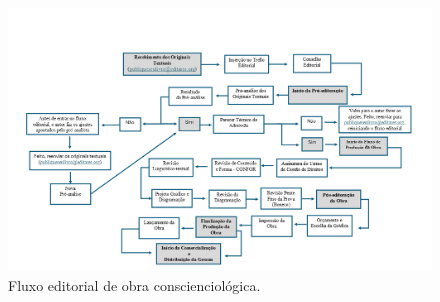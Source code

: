 \documentclass{gescons}
\begin{document}



\begin{figure}[h]
  \centering
  \caption*{Fluxo editorial de obra conscienciológica.} %
  \includegraphics[width=18cm]{articles/resumo/fotos/fluxo-editorial/fluxo-editorial-artigo.png}
\end{figure}


        
\end{document}
